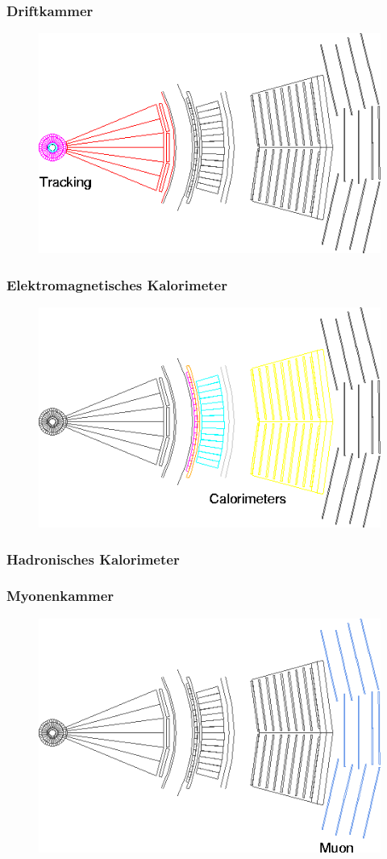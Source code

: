 \begin{frame}
	\frametitle{Driftkammer}
	\begin{center}
		\begin{figure}
			\includegraphics[width=0.75\linewidth]{graphics/slice_tracking_tr}
		\end{figure}
	\end{center}
\end{frame}

\begin{frame}
	\frametitle{Elektromagnetisches Kalorimeter}
	\begin{center}
		\begin{figure}
			\includegraphics[width=0.75\linewidth]{graphics/slice_calorimeter_tr}
		\end{figure}
	\end{center}
\end{frame}

\begin{frame}
	\frametitle{Hadronisches Kalorimeter}

\end{frame}

\begin{frame}
	\frametitle{Myonenkammer}
	\begin{center}
		\begin{figure}
			\includegraphics[width=0.75\linewidth]{graphics/slice_muon_tr}
		\end{figure}
	\end{center}
\end{frame}


